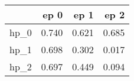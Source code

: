 \begin{tabular}{lrrr}
\toprule
{} &   ep 0 &   ep 1 &   ep 2 \\
\midrule
hp\_0 &  0.740 &  0.621 &  0.685 \\
hp\_1 &  0.698 &  0.302 &  0.017 \\
hp\_2 &  0.697 &  0.449 &  0.094 \\
\bottomrule
\end{tabular}
